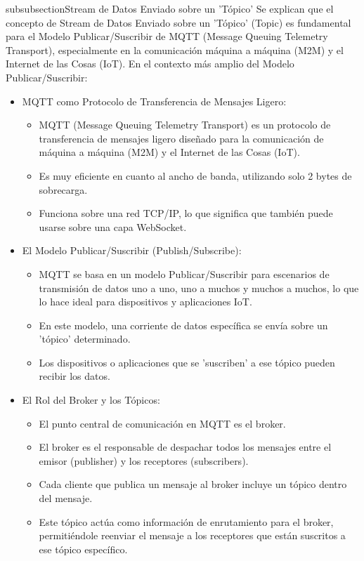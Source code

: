 \documentclass{report}
\begin{document}
subsubsection{Stream de Datos Enviado sobre un 'Tópico'}
Se  explican que el concepto de Stream de Datos Enviado sobre un 'Tópico' (Topic) es fundamental para el Modelo Publicar/Suscribir 
de MQTT (Message Queuing Telemetry Transport), especialmente en la comunicación máquina a máquina (M2M) y el Internet de las Cosas (IoT).
En el contexto más amplio del Modelo Publicar/Suscribir:
\begin{itemize}
    \item MQTT como Protocolo de Transferencia de Mensajes Ligero:
        \begin{itemize}
            \item MQTT (Message Queuing Telemetry Transport) es un protocolo de transferencia de mensajes ligero diseñado para 
            la comunicación de máquina a máquina (M2M) y el Internet de las Cosas (IoT).
            \item Es muy eficiente en cuanto al ancho de banda, utilizando solo 2 bytes de sobrecarga.
            \item Funciona sobre una red TCP/IP, lo que significa que también puede usarse sobre una capa WebSocket.        
        \end{itemize}
        
    \item El Modelo Publicar/Suscribir (Publish/Subscribe):
        \begin{itemize}
            \item MQTT se basa en un modelo Publicar/Suscribir para escenarios de transmisión de datos uno a uno, uno a muchos y 
            muchos a muchos, lo que lo hace ideal para dispositivos y aplicaciones IoT.
            \item En este modelo, una corriente de datos específica se envía sobre un 'tópico' determinado.
            \item Los dispositivos o aplicaciones que se 'suscriben' a ese tópico pueden recibir los datos.
        \end{itemize}

    \item El Rol del Broker y los Tópicos:
        \begin{itemize}
            \item El punto central de comunicación en MQTT es el broker.
            \item El broker es el responsable de despachar todos los mensajes entre el emisor (publisher) y los receptores (subscribers).
            \item Cada cliente que publica un mensaje al broker incluye un tópico dentro del mensaje.
            \item Este tópico actúa como información de enrutamiento para el broker, permitiéndole reenviar el mensaje a los receptores 
            que están suscritos a ese tópico específico.
        \end{itemize}


\end{itemize}
\end{document}
